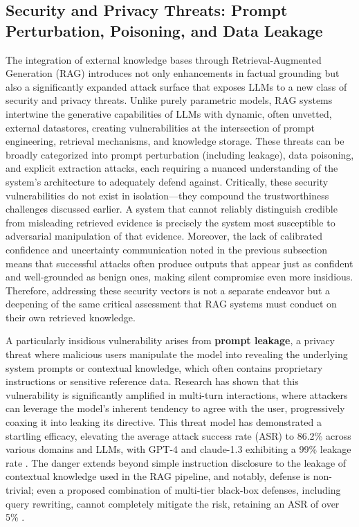 \documentclass[11pt]{article}
\begin{document}
\subsection{Security and Privacy Threats: Prompt Perturbation, Poisoning, and Data Leakage}

The integration of external knowledge bases through Retrieval-Augmented Generation (RAG) introduces not only enhancements in factual grounding but also a significantly expanded attack surface that exposes LLMs to a new class of security and privacy threats. Unlike purely parametric models, RAG systems intertwine the generative capabilities of LLMs with dynamic, often unvetted, external datastores, creating vulnerabilities at the intersection of prompt engineering, retrieval mechanisms, and knowledge storage. These threats can be broadly categorized into prompt perturbation (including leakage), data poisoning, and explicit extraction attacks, each requiring a nuanced understanding of the system's architecture to adequately defend against. Critically, these security vulnerabilities do not exist in isolation---they compound the trustworthiness challenges discussed earlier. A system that cannot reliably distinguish credible from misleading retrieved evidence is precisely the system most susceptible to adversarial manipulation of that evidence. Moreover, the lack of calibrated confidence and uncertainty communication noted in the previous subsection means that successful attacks often produce outputs that appear just as confident and well-grounded as benign ones, making silent compromise even more insidious. Therefore, addressing these security vectors is not a separate endeavor but a deepening of the same critical assessment that RAG systems must conduct on their own retrieved knowledge.

A particularly insidious vulnerability arises from \textbf{prompt leakage}, a privacy threat where malicious users manipulate the model into revealing the underlying system prompts or contextual knowledge, which often contains proprietary instructions or sensitive reference data. Research has shown that this vulnerability is significantly amplified in multi-turn interactions, where attackers can leverage the model's inherent tendency to agree with the user, progressively coaxing it into leaking its directive. This threat model has demonstrated a startling efficacy, elevating the average attack success rate (ASR) to 86.2\% across various domains and LLMs, with GPT-4 and claude-1.3 exhibiting a 99\% leakage rate \cite{ref159}. The danger extends beyond simple instruction disclosure to the leakage of contextual knowledge used in the RAG pipeline, and notably, defense is non-trivial; even a proposed combination of multi-tier black-box defenses, including query rewriting, cannot completely mitigate the risk, retaining an ASR of over 5\% \cite{ref159}.
\end{document}
